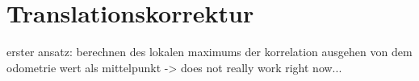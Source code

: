 \section{Translationskorrektur}

erster ansatz: berechnen des lokalen maximums der korrelation ausgehen von dem odometrie wert als mittelpunkt -> does not really work right now...
